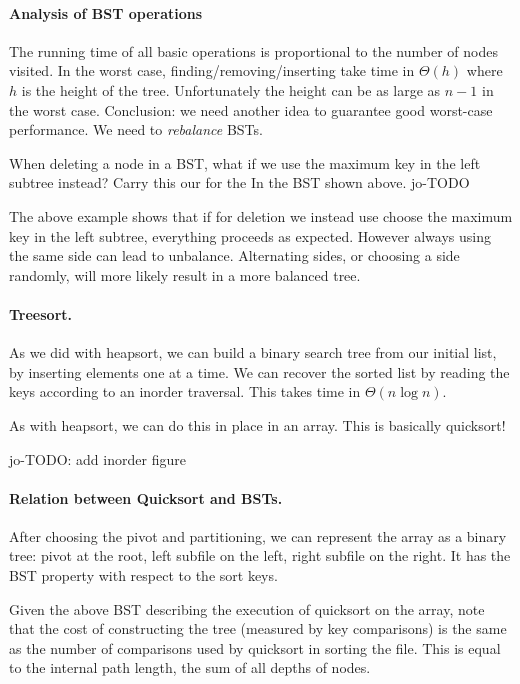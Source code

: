 \paragraph{Analysis of BST operations}

The running time of all basic operations is proportional to the number of 
nodes visited. In the worst case, finding/removing/inserting take time in $\Theta(h)$ 
where $h$ is the height of the tree. Unfortunately the height can be as large 
as $n-1$ in the worst case. Conclusion: we need another idea to guarantee good worst-case 
performance. We need to \emph{rebalance} BSTs.

\begin{Boxample}[4]
When deleting a node  in a BST, what if we use the maximum key in the left subtree instead?
Carry this our for the In the BST shown above.
jo-TODO

\end{Boxample}


The above example shows that if for deletion we instead use choose the maximum key in the left subtree, everything proceeds as expected. 
However always using the same side can lead to unbalance. Alternating sides, or choosing a side randomly, will more likely  result in a more 
balanced tree.


\paragraph{Treesort.}

As we did with heapsort, we can build a binary search tree from our initial list, by inserting 
elements one at a time. We can recover the sorted list by reading the keys according to an inorder traversal. This takes time in $\Theta(n\log n)$.

As with heapsort, we can do this in place in an array. This is basically quicksort!

jo-TODO: add inorder figure


\paragraph{Relation between Quicksort and BSTs.}

After choosing the pivot and partitioning, we can represent the array as a 
binary tree: pivot at the root, left subfile on the left, right subfile on the 
right. It has the BST property with respect to the sort keys.

Given the above BST describing the execution of quicksort on the array, 
note that the cost of constructing the tree (measured by key comparisons) is 
the same as the number of comparisons used by quicksort in sorting the file.
This is equal to the {internal path length}, the sum of all depths 
of nodes. 

